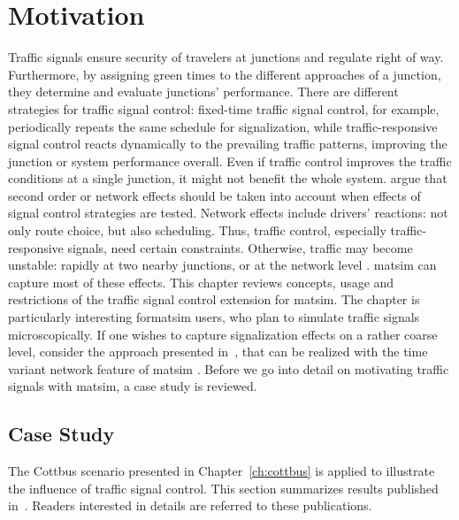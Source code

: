 \section{Motivation}
Traffic signals ensure security of travelers at junctions and regulate right of way. 
Furthermore, by assigning green times to the different approaches of a junction, they determine and evaluate junctions' performance. 
There are different strategies for traffic signal control: fixed-time traffic signal control, for example, periodically repeats the same schedule for signalization, while traffic-responsive signal control reacts dynamically to the prevailing traffic patterns, improving the junction or system performance overall.   
Even if traffic control improves the traffic conditions at a single junction, it might not benefit the whole system. 
\citet{Hu1997D2DFlowEvolutionReactiveSignalsDynasmart} argue that second order or network effects should be taken into account when effects of signal control strategies are tested. Network effects include drivers' reactions: not only route choice, but also scheduling. 
Thus, traffic control, especially traffic-responsive signals, need certain constraints. Otherwise, traffic may become unstable: rapidly at two nearby junctions, or at the network level \citep{LaemmerHelbing2010SelfStabilizingSignalControlRealNet}. \gls{matsim} can capture most of these effects. This chapter reviews concepts, usage and restrictions of the traffic signal control extension for \gls{matsim}. 
The chapter is particularly interesting for\gls{matsim} users, who plan to simulate traffic signals microscopically. 
If one wishes to capture signalization effects on a rather coarse level, consider the approach presented in~\citet[pp.~139][]{Charypar2008PhD}, that can be realized with the time variant network feature of \gls{matsim} \citep{00LaemmelGretherNagel2009TimeDependentNetworks}. 
Before we go into detail on motivating traffic signals with \gls{matsim}, a case study is reviewed. 

\subsection{Case Study}
The Cottbus scenario presented in Chapter~\ref{ch:cottbus} is applied to illustrate the influence of traffic signal control. 
This section summarizes results published in~\citet{GretherBischoffNagel2011CottbusSylviaEventAbstract,Grether2014PhD}. Readers interested in details are referred to these publications. 


